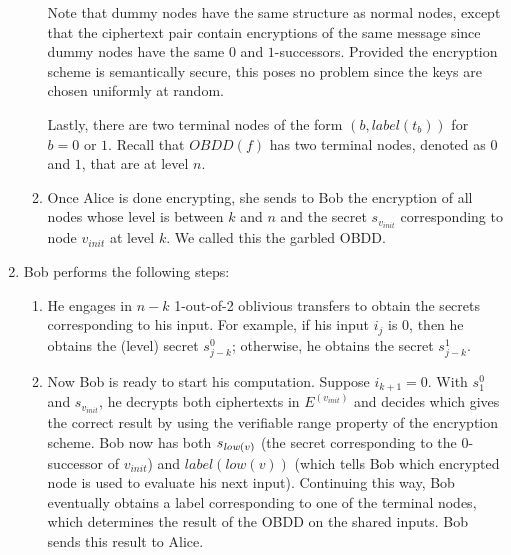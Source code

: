 \begin{enumerate}
\begin{enumerate}
Note that dummy nodes have the same structure as normal nodes, except
that the ciphertext pair contain encryptions of the same message since
dummy nodes have the same $0$ and $1$-successors. Provided the
encryption scheme is semantically secure, this poses no problem since
the keys are chosen uniformly at random.

Lastly, there are two terminal nodes of the form $(b,label(t_b))$ for
$b=0$ or $1$. Recall that $OBDD(f)$ has two terminal nodes, denoted as
$0$ and $1$, that are at level $n$.

\item Once Alice is done encrypting, she sends to Bob the encryption
of all nodes whose level is between $k$ and $n$ and the secret
$s_{v_{init}}$ corresponding to node $v_{init}$ at level $k$. We called
this the garbled OBDD.

\end{enumerate}

\item Bob performs the following steps:
\begin{enumerate}
\item He engages in $n-k$ 1-out-of-2 oblivious transfers to obtain the
secrets corresponding to his input. For example, if his input $i_j$ is
$0$, then he obtains the (level) secret $s_{j-k}^0$; otherwise, he
obtains the secret $s_{j-k}^1$.

\item Now Bob is ready to start his computation. Suppose
$i_{k+1}=0$. With $s_{1}^0$ and $s_{v_{init}}$, he decrypts both
ciphertexts in $E^{(v_{init})}$ and decides which gives the correct
result by using the verifiable range property of the encryption
scheme. Bob now has both $s_{{\it low}(v)}$ (the secret corresponding
to the $0$-successor of $v_{init}$) and $label(low(v))$ (which tells
Bob which encrypted node is used to evaluate his next
input). Continuing this way, Bob eventually obtains a label
corresponding to one of the terminal nodes, which determines the
result of the OBDD on the shared inputs. Bob sends this result to
Alice.
\end{enumerate}

\end{enumerate}

